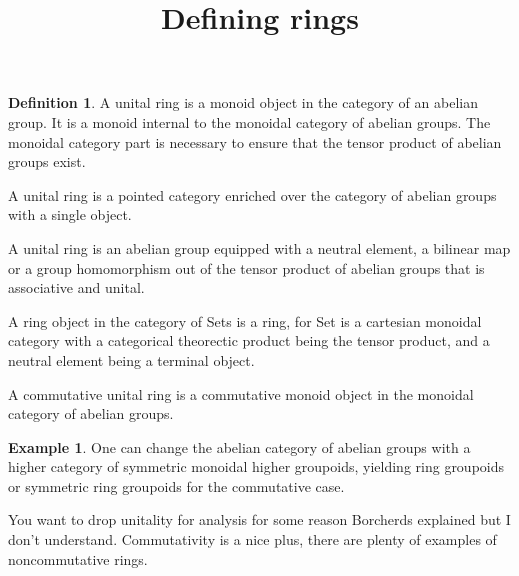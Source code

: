 \documentclass[10pt]{article}
\theoremstyle{plain}%
\theoremstyle{definition}
\newtheorem{definition}{Definition}[section]
\newtheorem{example}{Example}[section]
\theoremstyle{remark}
\begin{document}
\title{Defining rings}

\maketitle

\begin{definition}
	A unital ring is a monoid object in the category of an abelian group. It is a monoid internal to the monoidal category of abelian groups. The monoidal category part is necessary to ensure that the tensor product of abelian groups exist.

	A unital ring is a pointed category enriched over the category of abelian groups with a single object.

	A unital ring is an abelian group equipped with a neutral element, a bilinear map or a group homomorphism out of the tensor product of abelian groups that is associative and unital.

	A ring object in the category of Sets is a ring, for Set is a cartesian monoidal category with a categorical theorectic product being the tensor product, and a neutral element being a terminal object.

	A commutative unital ring is a commutative monoid object in the monoidal category of abelian groups.
\end{definition}

\begin{example}
	One can change the abelian category of abelian groups with a higher category of symmetric monoidal higher groupoids, yielding ring groupoids or symmetric ring groupoids for the commutative case.
\end{example}

You want to drop unitality for analysis for some reason Borcherds explained but I don't understand. Commutativity is a nice plus, there are plenty of examples of noncommutative rings.
\end{document}
